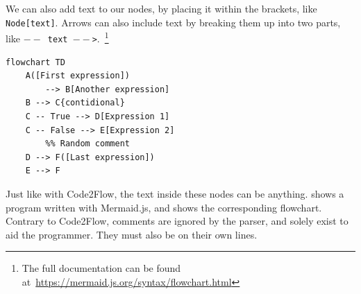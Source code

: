 We can also add text to our nodes, by placing it within the brackets, like \texttt{Node[text]}. Arrows can also include text by breaking them up into two parts, like \texttt{$--$ text $--$>}.~\footnote{The full documentation can be found at~\url{https://mermaid.js.org/syntax/flowchart.html}} \\

\begin{lstlisting}[caption={A mermaid.js program.}, captionpos=b, label={A mermaid.js program.}]
flowchart TD
    A([First expression])
        --> B[Another expression]
    B --> C{contidional}
    C -- True --> D[Expression 1]
    C -- False --> E[Expression 2]
        %% Random comment
    D --> F([Last expression])
    E --> F
\end{lstlisting}

Just like with Code2Flow, the text inside these nodes can be anything.  shows a program written with Mermaid.js, and  shows the corresponding flowchart. Contrary to Code2Flow, comments are ignored by the parser, and solely exist to aid the programmer. They must also be on their own lines. \\


